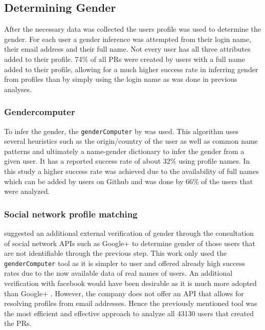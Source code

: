 \subsection{Determining Gender}
After the necessary data was collected the users profile was used to determine the gender. For each user a gender inference was attempted from their login name, their email address and their full name. Not every user has all three attributes added to their profile. 74\% of all \ac{PR}s were created by users with a full name added to their profile, allowing for a much higher success rate in inferring gender from profiles than by simply using the login name as was done in previous analyses.
\subsubsection{Gendercomputer}
To infer the gender, the \lstinline|genderComputer| by \citeauthor{vasilescu:2012:6542459} was used. This algorithm uses several heuristics such as the origin/country of the user as well as common name patterns and ultimately a name-gender dictionary to infer the gender from a given user. It has a reported success rate of about 32\% \cite{Vasilescu:2015:GTD:2702123.2702549} using profile names. In this study a higher success rate was achieved due to the availability of full names which can be added by users on Github and was done by 66\% of the users that were analyzed.

\subsubsection{Social network profile matching}
\citeauthor{genderdiff:2016} suggested an additional external verification of gender through the consultation of social network \ac{API}s such as Google+ to determine gender of those users that are not identifiable through the previous step.
This work only used the \lstinline|genderComputer| tool as it is simpler to user and offered already high success rates due to the now available data of real names of users. An additional verification with facebook would have been desirable as it is much more adopted than Google+ \cite{googleplusstats:2015,facebookstats:2017}. However, the company does not offer an \ac{API} that allows for resolving profiles from email addresses. Hence the previously mentioned tool was the most efficient and effective approach to analyze all 43130 users that created the \ac{PR}s.

